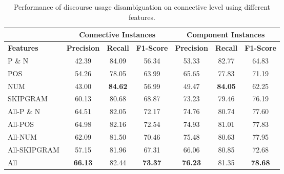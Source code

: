 \begin{table}[ht]
\centering
\begin{tabular}{|l|c|c|c|c|c|c|}
\hline
                    & \multicolumn{3}{c|}{Connective Instances}  & \multicolumn{3}{c|}{Component Instances}  \\ \hline
\bf Features        & \bf Precision & \bf Recall & \bf F1-Score  & \bf Precision & \bf Recall & \bf F1-Score \\ \hline
    P \& N          &     42.39     &     84.09  &     56.34     &     53.33     &     82.77  &     64.83    \\ \hline
    POS             &     54.26     &     78.05  &     63.99     &     65.65     &     77.83  &     71.19    \\ \hline
    NUM             &     43.00     & \bf 84.62  &     56.99     &     49.47     & \bf 84.05  &     62.25    \\ \hline
    SKIPGRAM        &     60.13     &     80.68  &     68.87     &     73.23     &     79.46  &     76.19    \\ \hline
    All-P \& N      &     64.51     &     82.05  &     72.17     &     74.76     &     80.74  &     77.60    \\ \hline
    All-POS         &     64.98     &     82.16  &     72.54     &     74.93     &     81.01  &     77.83    \\ \hline
    All-NUM         &     62.09     &     81.50  &     70.46     &     75.48     &     80.63  &     77.95    \\ \hline
    All-SKIPGRAM    &     57.15     &     81.96  &     67.31     &     66.06     &     80.85  &     72.68    \\ \hline
    All             & \bf 66.13     &     82.44  & \bf 73.37     & \bf 76.23     &     81.35  & \bf 78.68    \\ \hline

\end{tabular}
\caption{\label{t:recognition-connective-features} Performance of discourse usage
disambiguation on connective level using different features. }
\end{table}
